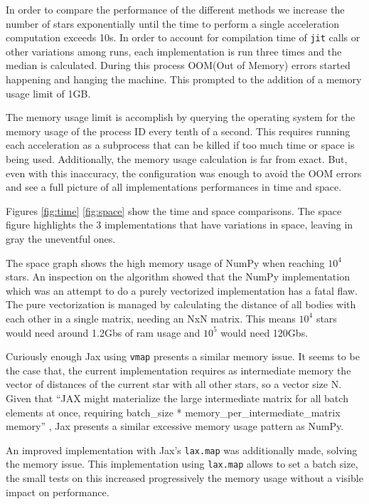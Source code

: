\documentclass[a4paper, 11pt]{article}         %
\begin{document}
In order to compare the performance of the different methods we increase the number of stars exponentially until the time to perform a single acceleration computation 
exceeds 10s. In order to account for compilation time of \texttt{jit} calls or other variations among runs, each implementation is run three times and the median is calculated.
During this process OOM(Out of Memory) errors started happening and hanging the machine.
This prompted to the addition of a memory usage limit of 1GB. 

The memory usage limit is accomplish by querying the operating system for the memory usage of the process ID every tenth of a second. This requires running each acceleration as a subprocess that can be killed if too much time or space is being used. Additionally, the memory usage calculation is far from exact.
But, even with this inaccuracy, the configuration was enough to avoid the OOM errors and see a full picture of all implementations performances in time and space.


Figures \ref{fig:time} \ref{fig:space} show the time and space comparisons. The space figure highlights the 3 implementations that have variations in space, leaving in gray the uneventful ones. 

The space graph shows the high memory usage of NumPy when reaching $10^4$ stars.
An inspection on the algorithm showed that the NumPy implementation which was an attempt to do a purely vectorized implementation has a fatal flaw. The pure vectorization is managed by calculating the distance of all bodies with each other in a single matrix, needing an NxN matrix. This means $10^4$ stars would need around 1.2Gbs of ram usage and $10^5$ would need 120Gbs.

Curiously enough Jax using \texttt{vmap} presents a similar memory issue.
It seems to be the case that, the current implementation requires as intermediate memory the vector of distances of the current star with all other stars, so a vector size N. Given that ``JAX might materialize the large intermediate matrix for all batch elements at once, requiring batch\_size * memory\_per\_intermediate\_matrix memory'' \parencite{JaxPerformance}, Jax presents a similar excessive memory usage pattern as NumPy.

An improved implementation with Jax's \texttt{lax.map} was additionally made, solving the memory issue.
This implementation using \texttt{lax.map} allows to set a batch size, the small tests on this increased progressively the memory usage without a visible impact on performance.
\end{document}
